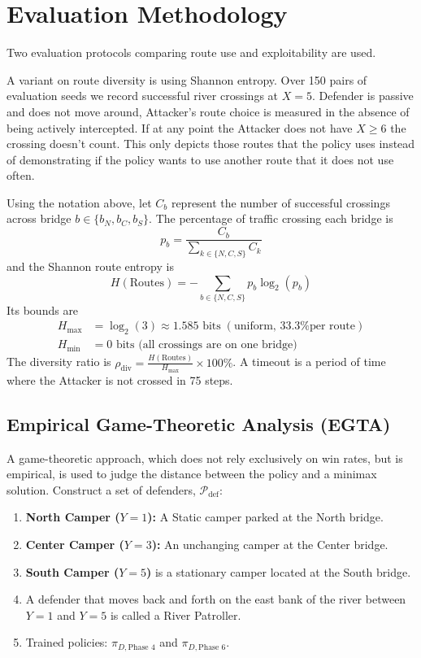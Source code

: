\documentclass[conference]{IEEEtran}
\begin{document}
\section{Evaluation Methodology}

Two evaluation protocols comparing route use and exploitability are used.

A variant on route diversity is using Shannon entropy.
Over 150 pairs of evaluation seeds we record successful river crossings at $X=5$. Defender is passive and does not move around, Attacker's route choice is measured in the absence of being actively intercepted. If at any point the Attacker does not have $X \ge 6$ the crossing doesn't count. This only depicts those routes that the policy uses instead of demonstrating if the policy wants to use another route that it does not use often.

Using the notation above, let $C_b$ represent the number of successful crossings across bridge $b \in \{b_N, b_C, b_S\}$. The percentage of traffic crossing each bridge is
\begin{equation}
p_b = \frac{C_b}{\sum_{k \in \{N, C, S\}} C_k}
\end{equation}
and the Shannon route entropy is
\begin{equation}
H(\text{Routes}) = -\sum_{b \in \{N, C, S\}} p_b \log_2(p_b)
\end{equation}
Its bounds are
\begin{align}
H_{\max} &= \log_2(3) \approx 1.585 \text{ bits}\;(\text{uniform, 33.3\% per route}) \\
H_{\min} &= 0 \text{ bits} \text{ (all crossings are on one bridge)}
\end{align}
The diversity ratio is $\rho_{\text{div}} = \frac{H(\text{Routes})}{H_{\max}} \times 100\%$. A timeout is a period of time where the Attacker is not crossed in 75 steps.

\subsection{Empirical Game-Theoretic Analysis (EGTA)}
A game-theoretic approach, which does not rely exclusively on win rates, but is empirical, is used to judge the distance between the policy and a minimax solution. Construct a set of defenders, $\mathcal{P}_{\text{def}}$:
\begin{enumerate}
    \item \textbf{North Camper ($Y=1$):} A Static camper parked at the North bridge.
    \item \textbf{Center Camper ($Y=3$):} An unchanging camper at the Center bridge.
    \item \textbf{South Camper ($Y=5$)} is a stationary camper located at the South bridge.
    \item A defender that moves back and forth on the east bank of the river between $Y=1$ and $Y=5$ is called a River Patroller.
    \item Trained policies: $\pi_{D, \text{Phase 4}}$ and $\pi_{D, \text{Phase 6}}$.
\end{enumerate}
\end{document}
